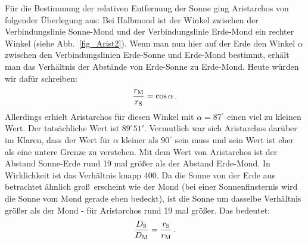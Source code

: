 F\"ur die Bestimmung der relativen Entfernung der Sonne ging Aristarchos von folgender 
\"Uberlegung aus: Bei Halbmond ist der Winkel zwischen der Verbindungslinie Sonne-Mond
und der Verbindungslinie Erde-Mond ein rechter Winkel (siehe Abb.\ \ref{fig_Arist2}). Wenn man nun hier auf der
Erde den Winkel $\alpha$ zwischen den Verbindungslinien Erde-Sonne und Erde-Mond 
bestimmt, erh\"alt man das Verh\"altnis der Abst\"ande von Erde-Sonne zu Erde-Mond.
Heute w\"urden wir daf\"ur schreiben:
\begin{equation}
\label{eq_Arist1}
                     \frac{r_{\rm M}}{r_{\rm S}} = \cos \alpha \, . 
\end{equation} 
Allerdings erhielt Aristarchos f\"ur diesen Winkel mit $\alpha = 87^\circ$ einen viel zu kleinen Wert.
Der tats\"achliche Wert ist $89^\circ 51'$. Vermutlich war sich Aristarchos dar\"uber im Klaren, dass
der Wert f\"ur $\alpha$ kleiner als $90^\circ$ sein muss und sein Wert ist eher als eine
untere Grenze zu verstehen. 
Mit dem Wert von Aristarchos ist der Abstand Sonne-Erde
rund 19 mal gr\"o\ss er als der Abstand Erde-Mond. In Wirklichkeit ist das Verh\"altnis knapp 400. 
Da die Sonne von der Erde aus betrachtet \"ahnlich gro\ss\ erscheint wie der Mond (bei einer
Sonnenfinsternis wird die Sonne vom Mond gerade eben bedeckt), ist die Sonne um dasselbe
Verh\"altnis gr\"o\ss er als der Mond - f\"ur Aristarchos rund 19 mal gr\"o\ss er. Das bedeutet:
\begin{equation}
\label{eq_Arist2}
                           \frac{D_{\rm S}}{D_{\rm M}} = \frac{r_{\rm S}}{r_{\rm M}} \, .
\end{equation}

